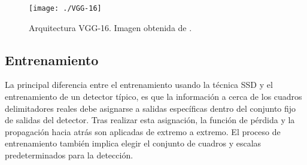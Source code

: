 \documentclass[a4paper, 12pt, spanish, chapterprefix, numbers=noenddot]{book}
\begin{document}
\begin{figure}[H]
\begin{center}
\texttt{[image: ./VGG-16]}
\caption{Arquitectura VGG-16. Imagen obtenida de \cite{SSD_2}.}
\label{VGG-16}
\end{center}
\end{figure}

\subsection{Entrenamiento}

La principal diferencia entre el entrenamiento usando la técnica SSD y el entrenamiento de un detector típico, es que la información a cerca de los cuadros delimitadores reales debe asignarse a salidas específicas dentro del conjunto fijo de salidas del detector. Tras realizar esta asignación, la función de pérdida y la propagación hacia atrás son aplicadas de extremo a extremo. El proceso de entrenamiento también implica elegir el conjunto de cuadros y escalas predeterminados para la detección.
\end{document}
